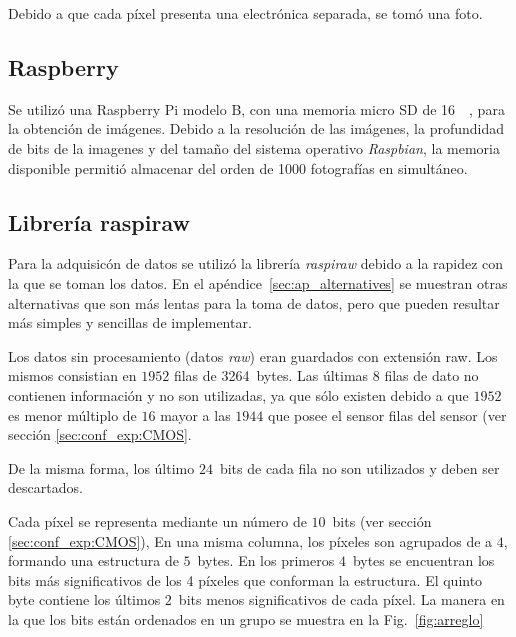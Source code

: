 \documentclass[twoside,twocolumn]{article}
\begin{document}
      Debido a que cada píxel presenta una electrónica separada, se tomó una foto.

    \subsection{Raspberry}
      Se utilizó una Raspberry Pi modelo B, con una memoria micro SD de \SI{16}{\giga\byte}, para la obtención de imágenes.
      Debido a la resolución de las imágenes, la profundidad de bits de la imagenes y del tamaño del sistema operativo \emph{Raspbian}, 
      la memoria disponible
      permitió almacenar del orden de 1000 fotografías en simultáneo.

    \subsection{Librería raspiraw}
      Para la adquisicón de datos se utilizó la librería {\it raspiraw}\cite{raspiraw} debido a la rapidez con la que se toman los datos.
      En el apéndice~\ref{sec:ap_alternatives} se muestran otras alternativas que son más lentas para la toma de datos,
      pero que pueden resultar más simples y sencillas de implementar.

      Los datos sin procesamiento (datos \emph{raw}) eran guardados con extensión raw.
      Los mismos consistian en $1952$ filas de 3264~bytes.
      Las últimas $8$ filas de dato no contienen información y no son utilizadas,
      ya que sólo existen debido a que $1952$ es menor múltiplo de $16$     %
      mayor a las $1944$ que posee el sensor filas del sensor (ver sección \ref{sec:conf_exp:CMOS}.

      De la misma forma, los último $24$~bits de cada fila no son utilizados y deben ser descartados.

      Cada píxel se representa mediante un número de $10$~bits (ver sección \ref{sec:conf_exp:CMOS}),
      En una misma columna, los píxeles son agrupados de a $4$, formando una estructura de $5$~bytes.
      En los primeros $4$~bytes se encuentran los bits más significativos de los 4 píxeles que conforman la estructura.
      El quinto byte contiene los últimos $2$~bits menos significativos de cada píxel.
      La manera en la que los bits están ordenados en un grupo se muestra en la Fig.~\ref{fig:arreglo}
\end{document}
